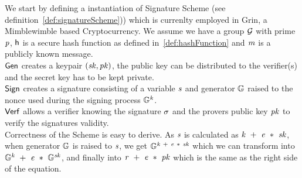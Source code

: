 We start by defining a instantiation of Signature Scheme (see definition~\ref{def:signatureScheme})) which is currenlty employed in Grin, a Mimblewimble based Cryptocurrency.
We assume we have a group $\mathcal{G}$ with prime $\mathit{p}$, $\mathsf{h}$ is a secure hash function as defined in~\ref{def:hashFunction} and $\mathit{m}$ is a publicly known message.\\
$\mathsf{\mathsf{Gen}}$ creates a keypair $(\mathit{sk}, \mathit{pk})$, the public key can be distributed to the verifier(s) and the secret key has to be kept private. \\
$\mathsf{Sign}$ creates a signature consisting of a variable $\mathit{s}$ and generator $\mathbb{G}$ raised to the nonce used during the signing process $\mathbb{G}^{\mathit{k}}$. \\
$\mathsf{Verf}$ allows a verifier knowing the signature $\sigma$ and the provers public key $\mathit{pk}$ to verify the signatures validity. \\
\fbox{
    \parbox{\textwidth}{
        \procedure[linenumbering, syntaxhighlight=auto]{$\procGen{\varSecParam}$} {
            \varKey \sample \cnstIntegersPrimeWithoutZero{\varPrime} \\
            \pcreturn (\varSecKey \opAssign \varKey \opSeperate \varPubKey \opAssign \funGen{\varKey})
        }
        \procedure[linenumbering, syntaxhighlight=auto]{$\procSign{\varMsg}{\varSecKey}$}{
            \varNonce \sample \cnstIntegersPrimeWithoutZero{\varPrime} \\
            \varRand \opAssign \funGen{\varNonce} \\
            \varSchnorrChallenge \opAssign \funHash{\varMsg \opConc \varRand \opConc \varPubKey} \\
            \varS \opAssign \varNonce \opAdd \varSchnorrChallenge \opMult \varSecKey \\
            \pcreturn \varSignature \opAssign (\varS, \varRand)
        }
        \procedure[linenumbering, syntaxhighlight=auto]{$\procVerf{\varMsg}{\varSignature}{\varPubKey}$} {
            \varS \opAssign \opAccess{\varSignature}{\varS} \\
            \varRand \opAssign \opAccess{\varSignature}{\varRand} \\
            \varSchnorrChallenge \opAssign \funHash{\varMsg \opConc \varRand \opConc \varPubKey} \\
            \pcreturn \funGen{\varS} \opEq \varRand \opAdd \varSchnorrChallenge \opMult \varPubKey
        }
    }
}
Correctness of the Scheme is easy to derive. As $\mathit{s}$ is calculated as $\mathit{k} ~+~ \mathit{e} ~*~ \mathit{sk}$, when generator $\mathbb{G}$ is raised to $\mathit{s}$, we get
$\mathbb{G}^{\mathit{k} ~+~ \mathit{e} ~*~ \mathit{sk}}$ which we can transform into $\mathbb{G}^{\mathit{k}} ~+~ \mathit{e} ~*~ \mathbb{G}^{\mathit{sk}}$, and finally
into $\mathit{r} ~+~ \mathit{e} ~*~ \mathit{pk}$ which is the same as the right side of the equation.

